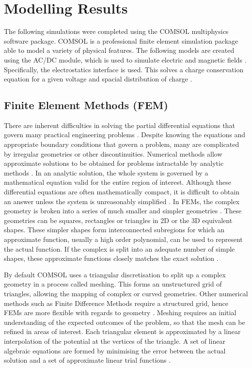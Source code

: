 
\section{Modelling Results}
The following simulations were completed using the COMSOL multiphysics software package.
COMSOL is a professional finite element simulation package able to model a variety of physical features.
The following models are created using the AC/DC module, which is used to simulate electric and magnetic fields \cite{ComsolACDC}.
Specifically, the electrostatics interface is used. 
This solves a charge conservation equation for a given voltage and spacial distribution of charge \cite{ComsolACDC}.



\subsection{Finite Element Methods (FEM)}
There are inherent difficulties in solving the partial differential equations that govern many practical engineering problems \cite{kuffel2000high}.
Despite knowing the equations and appropriate boundary conditions that govern a problem, many are complicated by irregular geometries or other discontinuities.
Numerical methods allow approximate solutions to be obtained for problems intractable by analytic methods \cite{meshkatoddini2006study}.
In an analytic solution, the whole system is governed by a mathematical equation valid for the entire region of interest. 
Although these differential equations are often mathematically compact, it is difficult to obtain an answer unless the system is unreasonably simplified \cite{meshkatoddini2006study}.
In FEMs, the complex geometry is broken into a series of much smaller and simpler geometries \cite{kuffel2000high}.
These geometries can be squares, rectangles or triangles in 2D or the 3D equivalent shapes. 
These simpler shapes form interconnected subregions for which an approximate function, usually a high order polynomial, can be used to represent the actual function.
If the complex is split into an adequate number of simple shapes, these approximate functions closely matches the exact solution \cite{meshkatoddini2006study}.

By default COMSOL uses a triangular discretisation to split up a complex geometry in a process called meshing.
This forms an unstructured grid of triangles, allowing the mapping of complex or curved geometries.
Other numerical methods such as Finite Difference Methods require a structured grid, hence FEMs are more flexible with regards to geometry \cite{kuffel2000high}.
Meshing requires an initial understanding of the expected outcomes of the problem, so that the mesh can be refined in areas of interest.
Each triangular element is approximated by a linear interpolation of the potential at the vertices of the triangle.
A set of linear algebraic equations are formed by minimising the error between the actual solution and a set of approximate linear trial functions \cite{meshkatoddini2006study}.

